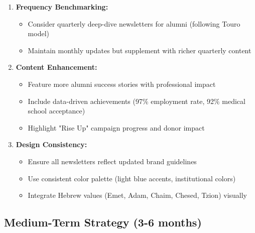 \documentclass[12pt,letterpaper]{article}
\begin{document}
\begin{enumerate}[leftmargin=*]
    \item \textbf{Frequency Benchmarking:}
    \begin{itemize}
        \item Consider quarterly deep-dive newsletters for alumni (following Touro model)
        \item Maintain monthly updates but supplement with richer quarterly content
    \end{itemize}

    \item \textbf{Content Enhancement:}
    \begin{itemize}
        \item Feature more alumni success stories with professional impact
        \item Include data-driven achievements (97\% employment rate, 92\% medical school acceptance)
        \item Highlight "Rise Up" campaign progress and donor impact
    \end{itemize}

    \item \textbf{Design Consistency:}
    \begin{itemize}
        \item Ensure all newsletters reflect updated brand guidelines
        \item Use consistent color palette (light blue accents, institutional colors)
        \item Integrate Hebrew values (Emet, Adam, Chaim, Chesed, Tzion) visually
    \end{itemize}
\end{enumerate}

\subsection{Medium-Term Strategy (3-6 months)}
\end{document}
